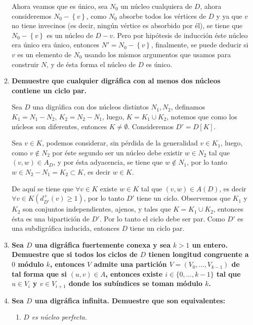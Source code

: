 \documentclass{article}
\newcommand{\set}[1]{\left\{ #1 \right\}}
\begin{document}
\begin{enumerate}
    Ahora veamos que es único, sea $N_0$ un núcleo cualquiera de $D$, ahora consideremos $N_0-\set{v}$, como $N_0$ absorbe todos los vértices de $D$ y ya que $v$ no tiene invecinos (es decir, ningún vértice es absorbido por él), se tiene que $N_0-\set{v}$ es un núcleo de $D-v$. Pero por hipótesis de inducción éste núcleo era único era único, entonces $N'=N_0-\set{v}$, finalmente, se puede deducir si $v$ es un elemento de $N_0$ usando los mismos argumentos que usamos para construir $N$, y de ésta forma el núcleo de $D$ es único.
  \item \textbf{Demuestre que cualquier digr\'afica con al menos dos n\'ucleos
    contiene un ciclo par.}

    Sea $D$ una digráfica con dos núcleos distintos $N_1,N_2$, definamos $K_1=N_1-N_2$, $K_2=N_2-N_1$, luego, $K=K_1\cup K_2$, notemos que como los núcleos son diferentes, entonces $K\neq\emptyset$. Consideremos $D'=D[K]$.

    Sea $v\in K$, podemos considerar, sin pérdida de la generalidad $v\in K_1$, luego, como $v\notin N_2$ por éste segundo ser un núcleo debe existir $w\in N_2$ tal que $(v,w)\in A_D$, y por ésta adyacencia, se tiene que $w\notin N_1$, por lo tanto $w\in N_2-N_1=K_2\subset K$, es decir $w\in K$.

    De aquí se tiene que $\forall v\in K$ existe $w\in K$ tal que $(v,w)\in A(D)$, es decir $\forall v\in K (d^+_{D'}(v)\geq 1)$, por lo tanto $D'$ tiene un ciclo. Observemos que $K_1$ y $K_2$ son conjuntos independientes, ajenos, y tales que $K=K_1\cup K_2$, entonces ésta es una bipartición de $D'$. Por lo tanto el ciclo debe ser par. Como $D'$ es una subdigráfica inducida, entonces $D$ tiene un ciclo par.

  \item \textbf{Sea $D$ una digr\'afica fuertemente conexa y sea $k > 1$ un entero.
    Demuestre que si todos los ciclos de $D$ tienen longitud congruente a
    $0$ m\'odulo $k$, entonces $V$ admite una partici\'on $V = (V_0, \dots,
    V_{k-1})$ de tal forma que si $(u,v) \in A$, entonces existe $i \in
    \{ 0, \dots, k-1 \}$ tal que $u \in V_i$ y $v \in V_{i+1}$ donde los
    sub\'indices se toman m\'odulo $k$.}

  \item \textbf{Sea $D$ una digr\'afica infinita.  Demuestre que son equivalentes:}
    \begin{enumerate}
      \item \textit{$D$ es n\'ucleo perfecta.}


\end{enumerate}
\end{enumerate}
\end{document}
